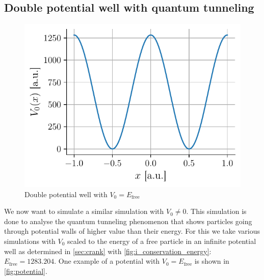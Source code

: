\subsection{Double potential well with quantum tunneling}
\begin{figure}
    \includegraphics[width=\linewidth]{figures/potential.pdf}
    \caption{Double potential well with $V_0 = E_\mathrm{free}$}
    \label{fig:potential}
\end{figure}
We now want to simulate a similar simulation with $V_0 \neq 0$. This simulation is done to analyse the quantum tunneling phenomenon that shows particles going through potential walls of higher value than their energy. For this we take various simulations with $V_0$ scaled to the energy of a free particle in an infinite potential well as determined in \autoref{sec:crank} with \autoref{fig:i_conservation_energy}: $E_\mathrm{free} = 1283.204$. One example of a potential with $V_0 = E_\mathrm{free}$ is shown in \autoref{fig:potential}.

